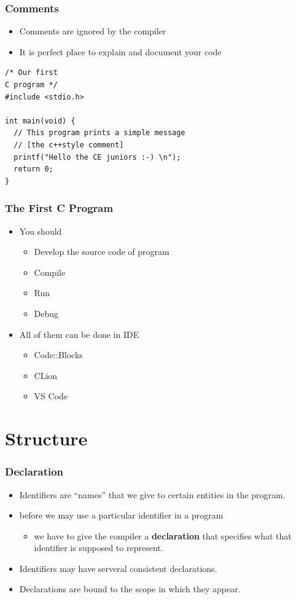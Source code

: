 \documentclass{../c-lecture}
\begin{document}
\begin{frame}[fragile]
  \frametitle{Comments}
  \begin{itemize}
    \item Comments are ignored by the compiler
    \item It is perfect place to explain and document your code
  \end{itemize}
  \begin{verbatim}
/* Our first
C program */
#include <stdio.h>

int main(void) {
  // This program prints a simple message
  // [the c++style comment]
  printf("Hello the CE juniors :-) \n");
  return 0;
}
  \end{verbatim}
\end{frame}

\begin{frame}
  \frametitle{The First C Program}
  \begin{itemize}
    \item You should
    \begin{itemize}
      \item Develop the source code of program
      \item Compile
      \item Run
      \item Debug
    \end{itemize}
    \item All of them can be done in IDE
    \begin{itemize}
      \item Code::Blocks
      \item CLion
      \item VS Code
    \end{itemize}
  \end{itemize}
\end{frame}

\section{Structure}

\begin{frame}
  \frametitle{Declaration}
  \begin{itemize}
    \item Identifiers are ``names'' that we give to certain entities in the program.
    \item before we may use a particular identifier in a program
    \begin{itemize}
      \item we have to give the compiler a \textbf{\color{Peach} declaration} that specifies what that identifier is supposed to represent.
    \end{itemize}
    \item Identifiers may have serveral consistent declarations.
    \item Declarations are bound to the scope in which they appear.
  \end{itemize}
\end{frame}
\end{document}
